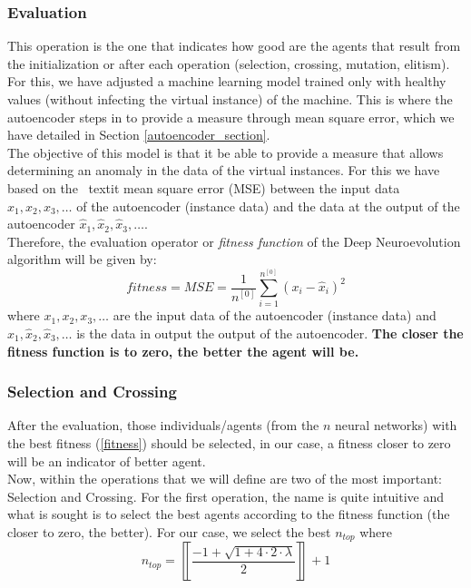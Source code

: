 \documentclass{iosart2c}
\begin{document}
\subsubsection{Evaluation}\label{evaluacion}

This operation is the one that indicates how good are the agents that result from the initialization or after each operation (selection, crossing, mutation, elitism). For this, we have adjusted a machine learning model trained only with healthy values (without infecting the virtual instance) of the machine. This is where the autoencoder steps in to provide a measure through mean square error, which we have detailed in Section \ref{autoencoder_section}.\\

The objective of this model is that it be able to provide a measure that allows determining an anomaly in the data of the virtual instances. For this we have based on the \ textit {mean square error} (MSE) between the input data ${x_1,x_2,x_3,\ldots}$ of the autoencoder (instance data) and the data at the output of the autoencoder ${\hat{x}_1,\hat{x}_2,\hat{x}_3,\ldots}$. \\

Therefore, the evaluation operator or \textit{fitness function} of the Deep Neuroevolution algorithm will be given by: \\
\begin{equation}\label{fitness}
    fitness=MSE=\frac{1}{n^{[0]}}\sum_{i=1}^{n^{[0]}} (x_i-\hat{x}_i)^2
\end{equation}
where ${x_1,x_2,x_3,\ldots}$ are the input data of the autoencoder (instance data) and ${\hat{x}_1,\hat{x}_2,\hat{x}_3,\ldots}$ is the data in output the output of the autoencoder. \textbf{The closer the fitness function is to zero, the better the agent will be.} \\



\subsubsection{Selection and Crossing}

After the evaluation, those individuals/agents (from the $n$ neural networks) with the best fitness (\ref{fitness}) should be selected, in our case, a fitness closer to zero will be an indicator of better agent. \\

Now, within the operations that we will define are two of the most important: Selection and Crossing. For the first operation, the name is quite intuitive and what is sought is to select the best agents according to the fitness function (the closer to zero, the better). For our case, we select the best $n_{top}$ where
\begin{equation}\label{n_top}
    n_{top}=\left\llbracket\frac{-1+\sqrt{1+4\cdot2\cdot \lambda}}{2}\right\rrbracket+1
\end{equation}
\end{document}
